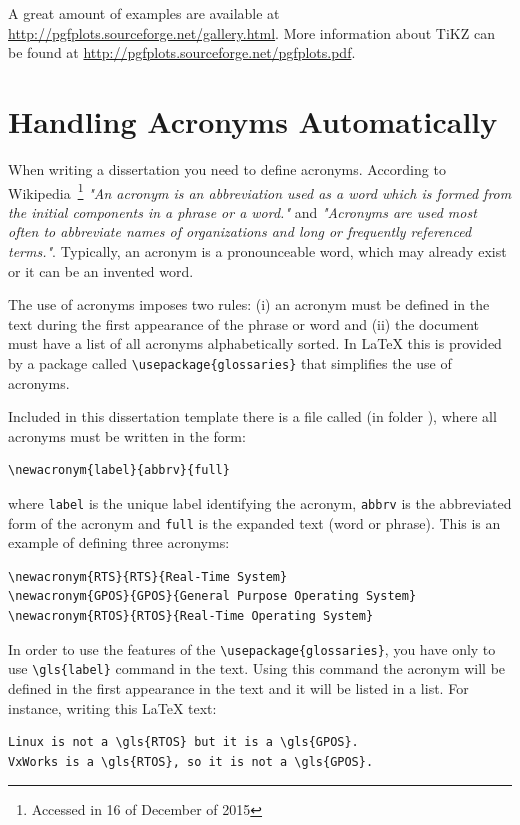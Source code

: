 A great amount of examples are available at \url{http://pgfplots.sourceforge.net/gallery.html}. 
More information about TiKZ can be found at 
\url{http://pgfplots.sourceforge.net/pgfplots.pdf}.


\section{Handling Acronyms Automatically}
When writing a dissertation you need to define acronyms.
According to Wikipedia~\footnote{Accessed in 16 of December of 2015} \textit{"An acronym is an abbreviation used as a word which is formed from the initial components in a phrase or a word."} and
\textit{"Acronyms are used most often to abbreviate names of organizations and long or frequently referenced terms."}.
Typically, an acronym is a pronounceable word, which may already exist or it can be an invented word. 

The use of acronyms imposes two rules: (i) an acronym must be defined in the text during the first appearance of the phrase or word and (ii) the document must have a list of all acronyms alphabetically sorted. In \LaTeX{} this is provided by a package called \verb|\usepackage{glossaries}| that simplifies the use of acronyms. 

Included in this dissertation template there is a file called  (in folder ), where all acronyms must be written in the form:
\begin{verbatim}
\newacronym{label}{abbrv}{full}
\end{verbatim}
where \verb|label| is the unique label identifying the acronym, \verb|abbrv| is the abbreviated form of the acronym and \verb|full| is the expanded text (word or phrase). This is an example of defining three acronyms:
\begin{verbatim}
\newacronym{RTS}{RTS}{Real-Time System}
\newacronym{GPOS}{GPOS}{General Purpose Operating System}
\newacronym{RTOS}{RTOS}{Real-Time Operating System}
\end{verbatim}

In order to use the features of the \verb|\usepackage{glossaries}|, you have only to use \verb|\gls{label}| command in the text. 
Using this command the acronym will be defined in the first appearance in the text and it will be listed in a list.
For instance, writing this \LaTeX{} text:
\begin{verbatim}
Linux is not a \gls{RTOS} but it is a \gls{GPOS}. 
VxWorks is a \gls{RTOS}, so it is not a \gls{GPOS}.
\end{verbatim}

